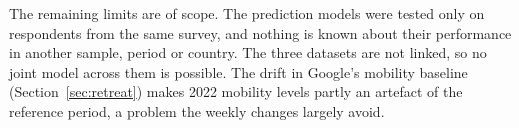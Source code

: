 The remaining limits are of scope. The prediction models were tested only on respondents from the same survey, and nothing is known about their performance in another sample, period or country. The three datasets are not linked, so no joint model across them is possible. The drift in Google's mobility baseline (Section~\ref{sec:retreat}) makes 2022 mobility levels partly an artefact of the reference period, a problem the weekly changes largely avoid.
